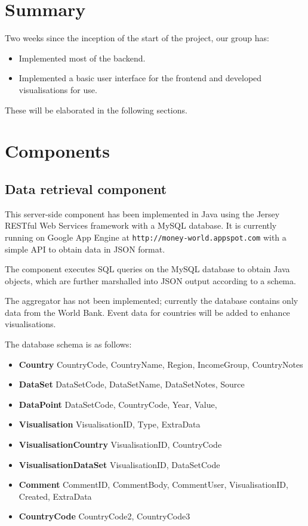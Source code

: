 \documentclass[12pt,a4paper,twoside]{article}
\begin{document}

\newpage
\thispagestyle{empty}
\cleardoublepage
\newpage

\section{Summary}

Two weeks since the inception of the start of the project, our group has:

\begin{itemize}
	\item Implemented most of the backend.
	\item Implemented a basic user interface for the frontend and developed visualisations for use.
\end{itemize}

These will be elaborated in the following sections.

\section{Components}

\subsection{Data retrieval component}
This server-side component has been implemented in Java using the Jersey RESTful Web Services framework with a MySQL database. It is currently running on Google App Engine at \texttt{http://money-world.appspot.com} with a simple API to obtain data in JSON format.

The component executes SQL queries on the MySQL database to obtain Java objects, which are further marshalled into JSON output according to a schema.

The aggregator has not been implemented; currently the database contains only data from the World Bank. Event data for countries will be added to enhance visualisations.

The database schema is as follows:

\begin{itemize}
	\item \textbf{Country} CountryCode, CountryName, Region, IncomeGroup, CountryNotes
	\item \textbf{DataSet} DataSetCode, DataSetName, DataSetNotes, Source
	\item \textbf{DataPoint} DataSetCode, CountryCode, Year, Value,
	\item \textbf{Visualisation} VisualisationID, Type, ExtraData
	\item \textbf{VisualisationCountry} VisualisationID, CountryCode
	\item \textbf{VisualisationDataSet} VisualisationID, DataSetCode
	\item \textbf{Comment} CommentID, CommentBody, CommentUser, VisualisationID, Created, ExtraData
	\item \textbf{CountryCode} CountryCode2, CountryCode3
\end{itemize}
\end{document}
